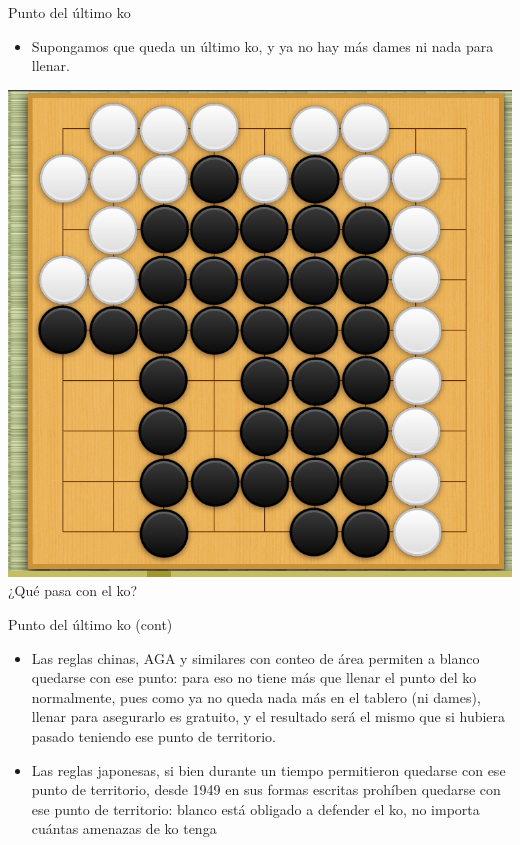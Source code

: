 \documentclass{beamer}
\begin{document}
\begin{frame}{Punto del último ko}

    \begin{itemize}
        \item Supongamos que queda un último ko, y ya no hay más dames ni nada para llenar.
        
    \end{itemize}
    \includegraphics[scale=0.2]{last-ko.png} ¿Qué pasa con el ko? 
  
\end{frame}

\begin{frame}{Punto del último ko (cont)}

    \begin{itemize}
        \item Las reglas chinas, AGA y similares con conteo de área permiten a blanco quedarse con ese punto: para eso no tiene más que llenar el punto del ko
         normalmente, pues como ya no queda nada más en el tablero (ni dames), llenar para asegurarlo es gratuito, y el resultado será el mismo que si hubiera pasado
         teniendo ese punto de territorio.
        \item Las reglas japonesas, si bien durante un tiempo permitieron quedarse con ese punto de territorio, desde 1949 en sus formas escritas prohíben
         quedarse con ese punto de territorio: blanco está obligado a defender el ko, no importa cuántas amenazas de ko tenga
    \end{itemize}
  
\end{frame}
\end{document}
